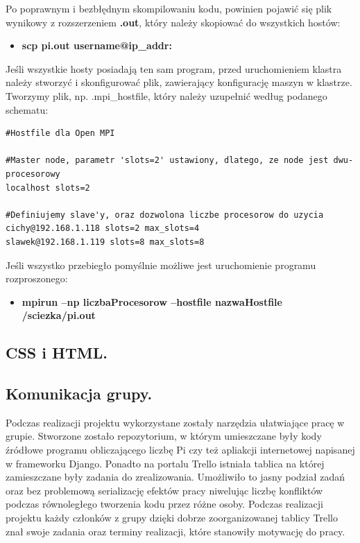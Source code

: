 \documentclass[a4paper,12pt]{article}		%
\begin{document}
Po poprawnym i bezbłędnym skompilowaniu kodu, powinien pojawić się plik wynikowy z rozszerzeniem \textbf{.out}, który należy skopiować do wszystkich hostów:

\begin{itemize}
\item \textbf{scp pi.out username@ip\_addr:~}
\end{itemize}

Jeśli wszystkie hosty posiadają ten sam program, przed uruchomieniem klastra należy stworzyć i skonfigurować plik, zawierający konfigurację maszyn w klastrze. Tworzymy plik, np. .mpi\_hostfile, który należy uzupełnić według podanego schematu:

\begin{lstlisting}
#Hostfile dla Open MPI

#Master node, parametr 'slots=2' ustawiony, dlatego, ze node jest dwu-procesorowy
localhost slots=2

#Definiujemy slave'y, oraz dozwolona liczbe procesorow do uzycia
cichy@192.168.1.118 slots=2 max_slots=4
slawek@192.168.1.119 slots=8 max_slots=8
\end{lstlisting}

Jeśli wszystko przebiegło pomyślnie możliwe jest uruchomienie programu rozproszonego:
\begin{itemize}
\item \textbf{mpirun –np liczbaProcesorow –hostfile nazwaHostfile /sciezka/pi.out}
\end{itemize}
\subsection{CSS i HTML.}
\subsection{Komunikacja grupy.}
Podczas realizacji projektu wykorzystane zostały narzędzia ułatwiające pracę w grupie. Stworzone zostało repozytorium, w którym umieszczane były kody źródłowe programu obliczającego liczbę Pi czy też apliakcji internetowej napisanej w frameworku Django. Ponadto na portalu Trello istniała tablica na której zamieszczane były zadania do zrealizowania. Umożliwiło to jasny podział zadań oraz bez problemową serializację efektów pracy niwelując liczbę konfliktów podczas równoległego tworzenia kodu przez różne osoby. Podczas realizacji projektu każdy członków z grupy dzięki dobrze zoorganizowanej tablicy Trello znał swoje zadania oraz terminy realizacji, które stanowiły motywację do pracy.
\end{document}
